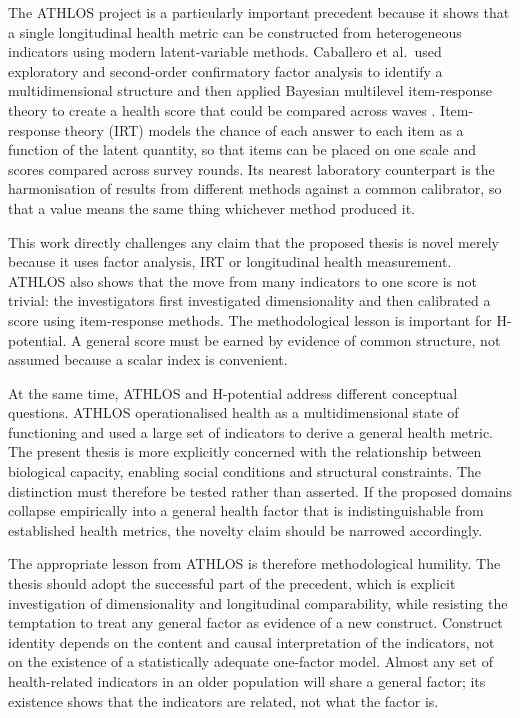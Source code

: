 The ATHLOS project is a particularly important precedent because it shows that a single longitudinal health metric can be constructed from heterogeneous indicators using modern latent-variable methods. Caballero et al.\ used exploratory and second-order confirmatory factor analysis to identify a multidimensional structure and then applied Bayesian multilevel item-response theory to create a health score that could be compared across waves \citep{caballero_athlos_2017}. Item-response theory (IRT) models the chance of each answer to each item as a function of the latent quantity, so that items can be placed on one scale and scores compared across survey rounds. Its nearest laboratory counterpart is the harmonisation of results from different methods against a common calibrator, so that a value means the same thing whichever method produced it.

This work directly challenges any claim that the proposed thesis is novel merely because it uses factor analysis, IRT or longitudinal health measurement. ATHLOS also shows that the move from many indicators to one score is not trivial: the investigators first investigated dimensionality and then calibrated a score using item-response methods. The methodological lesson is important for H-potential. A general score must be earned by evidence of common structure, not assumed because a scalar index is convenient.

At the same time, ATHLOS and H-potential address different conceptual questions. ATHLOS operationalised health as a multidimensional state of functioning and used a large set of indicators to derive a general health metric. The present thesis is more explicitly concerned with the relationship between biological capacity, enabling social conditions and structural constraints. The distinction must therefore be tested rather than asserted. If the proposed domains collapse empirically into a general health factor that is indistinguishable from established health metrics, the novelty claim should be narrowed accordingly.

The appropriate lesson from ATHLOS is therefore methodological humility. The thesis should adopt the successful part of the precedent, which is explicit investigation of dimensionality and longitudinal comparability, while resisting the temptation to treat any general factor as evidence of a new construct. Construct identity depends on the content and causal interpretation of the indicators, not on the existence of a statistically adequate one-factor model. Almost any set of health-related indicators in an older population will share a general factor; its existence shows that the indicators are related, not what the factor is.

